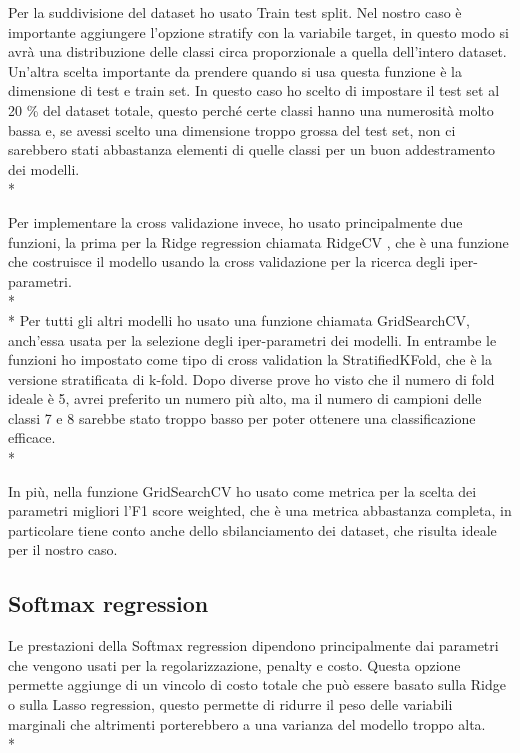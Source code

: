 Per la suddivisione del dataset ho usato Train test split. Nel nostro caso è importante aggiungere l’opzione stratify con la variabile target, in questo modo si avrà una distribuzione delle classi circa proporzionale a quella dell’intero dataset. Un'altra scelta importante da prendere quando si usa questa funzione è la dimensione di test e train set. In questo caso ho scelto di impostare il test set al 20 \% del dataset totale, questo perché certe classi hanno una numerosità molto bassa e, se avessi scelto una dimensione troppo grossa del test set, non ci sarebbero stati abbastanza elementi di quelle classi per un buon addestramento dei modelli. \\*

Per implementare la cross validazione invece, ho usato principalmente due funzioni, la prima per la Ridge regression chiamata RidgeCV , che è una funzione che costruisce il modello usando la cross validazione per la ricerca degli iper-parametri. \\*\\*
Per tutti gli altri modelli ho usato una funzione chiamata GridSearchCV, anch'essa usata per la selezione degli iper-parametri dei modelli. In entrambe le funzioni ho impostato come tipo di cross validation la StratifiedKFold, che è la versione stratificata di k-fold. Dopo diverse prove ho visto che il numero di fold ideale è 5, avrei preferito un numero più alto, ma il numero di campioni delle classi 7 e 8 sarebbe stato troppo basso per poter ottenere una classificazione efficace.\\*
 
In più, nella funzione GridSearchCV ho usato come metrica per la scelta dei parametri migliori l’F1 score weighted, che è una metrica abbastanza completa, in particolare tiene conto anche dello sbilanciamento dei dataset, che risulta ideale per il nostro caso.
 
\subsection{Softmax regression}\label{softmax}
\normalsize
Le prestazioni della Softmax regression dipendono principalmente dai parametri che vengono usati per la regolarizzazione, penalty e costo. Questa opzione permette aggiunge di un vincolo di costo totale che può essere basato sulla Ridge o sulla Lasso regression, questo permette di ridurre il peso delle variabili marginali che altrimenti porterebbero a una varianza del modello troppo alta.\\*

